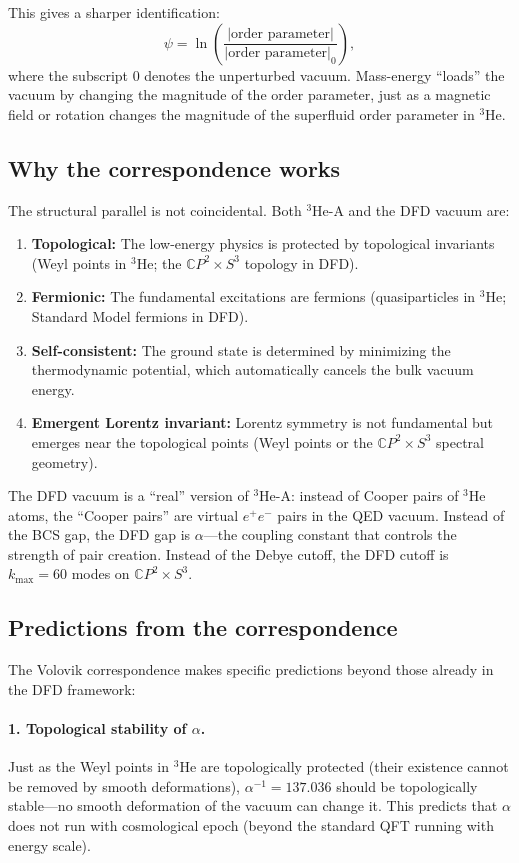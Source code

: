 \documentclass[aps,prd,twocolumn,superscriptaddress,nofootinbib]{revtex4-2}
\newcommand{\CP}{\mathbb{C}P}
\begin{document}
This gives a sharper identification:
\begin{equation}
\psi = \ln\left(\frac{|\text{order parameter}|}{|\text{order
parameter}|_0}\right),
\end{equation}
where the subscript $0$ denotes the unperturbed vacuum.  Mass-energy
``loads'' the vacuum by changing the magnitude of the order parameter,
just as a magnetic field or rotation changes the magnitude of the
superfluid order parameter in $^3$He.

\subsection{Why the correspondence works}

The structural parallel is not coincidental.  Both $^3$He-A and the
DFD vacuum are:
\begin{enumerate}
\item \textbf{Topological:} The low-energy physics is protected by
  topological invariants (Weyl points in $^3$He; the $\CP^2 \times
  S^3$ topology in DFD).
\item \textbf{Fermionic:} The fundamental excitations are fermions
  (quasiparticles in $^3$He; Standard Model fermions in DFD).
\item \textbf{Self-consistent:} The ground state is determined by
  minimizing the thermodynamic potential, which automatically
  cancels the bulk vacuum energy.
\item \textbf{Emergent Lorentz invariant:} Lorentz symmetry is not
  fundamental but emerges near the topological points (Weyl points
  or the $\CP^2 \times S^3$ spectral geometry).
\end{enumerate}

The DFD vacuum is a ``real'' version of $^3$He-A: instead of Cooper
pairs of $^3$He atoms, the ``Cooper pairs'' are virtual $e^+e^-$
pairs in the QED vacuum.  Instead of the BCS gap, the DFD gap is
$\alpha$---the coupling constant that controls the strength of pair
creation.  Instead of the Debye cutoff, the DFD cutoff is
$k_{\max} = 60$ modes on $\CP^2 \times S^3$.

\subsection{Predictions from the correspondence}

The Volovik correspondence makes specific predictions beyond those
already in the DFD framework:

\paragraph{1. Topological stability of $\alpha$.}
Just as the Weyl points in $^3$He are topologically protected (their
existence cannot be removed by smooth deformations), $\alpha^{-1} =
137.036$ should be topologically stable---no smooth deformation of
the vacuum can change it.  This predicts that $\alpha$ does not run
with cosmological epoch (beyond the standard QFT running with energy
scale).
\end{document}
